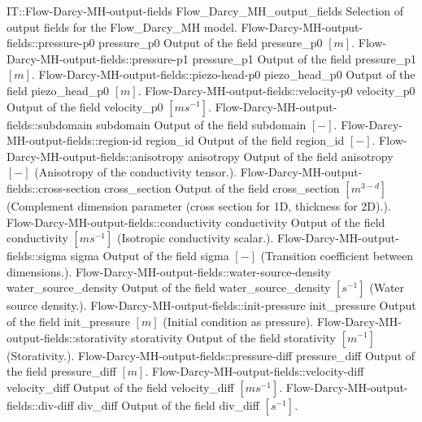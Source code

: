 \begin{SelectionType}
	{IT::Flow-Darcy-MH-output-fields}
	{Flow{\_}Darcy{\_}MH{\_}output{\_}fields}
	{{{Selection of output fields for the Flow{\_}Darcy{\_}MH model.}}}
		\SelectionItem
			{Flow-Darcy-MH-output-fields::pressure-p0}
			{pressure{\_}p0}
			{{{Output of the field pressure{\_}p0 }{$[m]$}{.}}}
		\SelectionItem
			{Flow-Darcy-MH-output-fields::pressure-p1}
			{pressure{\_}p1}
			{{{Output of the field pressure{\_}p1 }{$[m]$}{.}}}
		\SelectionItem
			{Flow-Darcy-MH-output-fields::piezo-head-p0}
			{piezo{\_}head{\_}p0}
			{{{Output of the field piezo{\_}head{\_}p0 }{$[m]$}{.}}}
		\SelectionItem
			{Flow-Darcy-MH-output-fields::velocity-p0}
			{velocity{\_}p0}
			{{{Output of the field velocity{\_}p0 }{$[ms^{-1}]$}{.}}}
		\SelectionItem
			{Flow-Darcy-MH-output-fields::subdomain}
			{subdomain}
			{{{Output of the field subdomain }{$[-]$}{.}}}
		\SelectionItem
			{Flow-Darcy-MH-output-fields::region-id}
			{region{\_}id}
			{{{Output of the field region{\_}id }{$[-]$}{.}}}
		\SelectionItem
			{Flow-Darcy-MH-output-fields::anisotropy}
			{anisotropy}
			{{{Output of the field anisotropy }{$[-]$}{ (Anisotropy of the conductivity tensor.).}}}
		\SelectionItem
			{Flow-Darcy-MH-output-fields::cross-section}
			{cross{\_}section}
			{{{Output of the field cross{\_}section }{$[m^{3-d}]$}{ (Complement dimension parameter (cross section for 1D, thickness for 2D).).}}}
		\SelectionItem
			{Flow-Darcy-MH-output-fields::conductivity}
			{conductivity}
			{{{Output of the field conductivity }{$[ms^{-1}]$}{ (Isotropic conductivity scalar.).}}}
		\SelectionItem
			{Flow-Darcy-MH-output-fields::sigma}
			{sigma}
			{{{Output of the field sigma }{$[-]$}{ (Transition coefficient between dimensions.).}}}
		\SelectionItem
			{Flow-Darcy-MH-output-fields::water-source-density}
			{water{\_}source{\_}density}
			{{{Output of the field water{\_}source{\_}density }{$[s^{-1}]$}{ (Water source density.).}}}
		\SelectionItem
			{Flow-Darcy-MH-output-fields::init-pressure}
			{init{\_}pressure}
			{{{Output of the field init{\_}pressure }{$[m]$}{ (Initial condition as pressure).}}}
		\SelectionItem
			{Flow-Darcy-MH-output-fields::storativity}
			{storativity}
			{{{Output of the field storativity }{$[m^{-1}]$}{ (Storativity.).}}}
		\SelectionItem
			{Flow-Darcy-MH-output-fields::pressure-diff}
			{pressure{\_}diff}
			{{{Output of the field pressure{\_}diff }{$[m]$}{.}}}
		\SelectionItem
			{Flow-Darcy-MH-output-fields::velocity-diff}
			{velocity{\_}diff}
			{{{Output of the field velocity{\_}diff }{$[ms^{-1}]$}{.}}}
		\SelectionItem
			{Flow-Darcy-MH-output-fields::div-diff}
			{div{\_}diff}
			{{{Output of the field div{\_}diff }{$[s^{-1}]$}{.}}}
\end{SelectionType}
